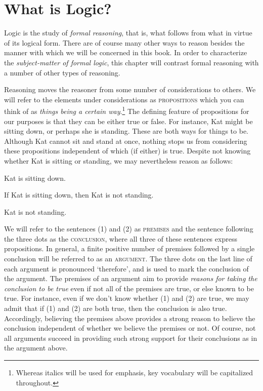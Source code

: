 \chapter{What is Logic?}
\label{ch.intro}

Logic is the study of \textit{formal reasoning}, that is, what follows from what in virtue of its logical form.
There are of course many other ways to reason besides the manner with which we will be concerned in this book.
In order to characterize the \textit{subject-matter of formal logic}, this chapter will contrast formal reasoning with a number of other types of reasoning.

Reasoning moves the reasoner from some number of considerations to others.
We will refer to the elements under considerations as \textsc{propositions} which you can think of as \textit{things being a certain way}.\footnote{Whereas italics will be used for emphasis, key vocabulary will be capitalized throughout.}
The defining feature of propositions for our purposes is that they can be either true or false.
For instance, Kat might be sitting down, or perhaps she is standing.
These are both ways for things to be.
Although Kat cannot sit and stand at once, nothing stops us from considering these propositions independent of which (if either) is true.
Despite not knowing whether Kat is sitting or standing, we may nevertheless reason as follows:

\label{argStanding}
\begin{earg}
  \item[(1)] Kat is sitting down.
  \item[(2)] If Kat is sitting down, then Kat is not standing.
  \item[\therefore] Kat is not standing.
\end{earg}

We will refer to the sentences (1) and (2) as \textsc{premises} and the sentence following the three dots as the \textsc{conclusion}, where all three of these sentences express propositions.
In general, a finite positive number of premises followed by a single conclusion will be referred to as an \textsc{argument}.
The three dots on the last line of each argument is pronounced `therefore', and is used to mark the conclusion of the argument.
The premises of an argument aim to provide \textit{reasons for taking the conclusion to be true} even if not all of the premises are true, or else known to be true.
For instance, even if we don't know whether (1) and (2) are true, we may admit that if (1) and (2) are both true, then the conclusion is also true.
Accordingly, believing the premises above provides a strong reason to believe the conclusion independent of whether we believe the premises or not.
Of course, not all arguments succeed in providing such strong support for their conclusions as in the argument above.

